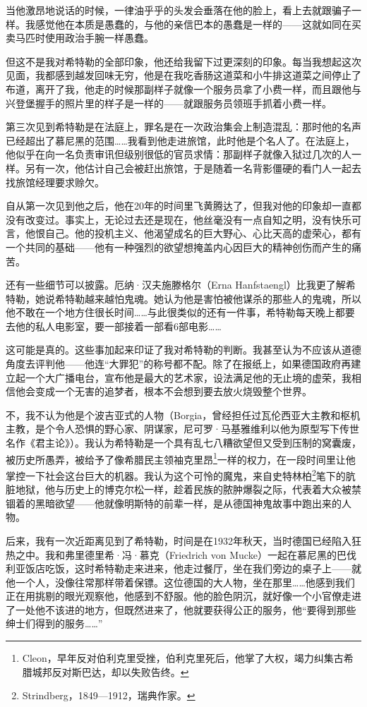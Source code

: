 \documentclass[UTF8]{ctexart}
\begin{document}
当他激昂地说话的时候，一律油乎乎的头发会垂落在他的脸上，看上去就跟骗子一样。我感觉他在本质是愚蠢的，与他的亲信巴本的愚蠢是一样的——这就如同在买卖马匹时使用政治手腕一样愚蠢。

但这不是我对希特勒的全部印象，他还给我留下过更深刻的印象。每当我想起这次见面，我都感到越发回味无穷，他是在我吃香肠这道菜和小牛排这道菜之间停止了布道，离开了我，他走的时候那副样子就像一个服务员拿了小费一样，而且跟他与兴登堡握手的照片里的样子是一样的——就跟服务员领班手抓着小费一样。

第三次见到希特勒是在法庭上，罪名是在一次政治集会上制造混乱：那时他的名声已经超出了慕尼黑的范围……我看到他走进旅馆，此时他是个名人了。在法庭上，他似乎在向一名负责审讯但级别很低的官员求情：那副样子就像入狱过几次的人一样。另有一次，他估计自己会被赶出旅馆，于是随着一名背影僵硬的看门人一起去找旅馆经理要求赊欠。

自从第一次见到他之后，他在20年的时间里飞黄腾达了，但我对他的印象却一直都没有改变过。事实上，无论过去还是现在，他丝毫没有一点自知之明，没有快乐可言，他恨自己。他的投机主义、他渴望成名的巨大野心、心比天高的虚荣心，都有一个共同的基础——他有一种强烈的欲望想掩盖内心因巨大的精神创伤而产生的痛苦。

还有一些细节可以披露。厄纳·汉夫施滕格尔（Erna Hanfstaengl）比我更了解希特勒，她说希特勒越来越怕鬼魂。她认为他是害怕被他谋杀的那些人的鬼魂，所以他不敢在一个地方住很长时间……与此很类似的还有一件事，希特勒每天晚上都要去他的私人电影室，要一部接着一部看6部电影……

这可能是真的。这些事加起来印证了我对希特勒的判断。我甚至认为不应该从道德角度去评判他——他连“大罪犯”的称号都不配。除了在报纸上，如果德国政府再建立起一个大广播电台，宣布他是最大的艺术家，设法满足他的无止境的虚荣，我相信他会变成一个无害的追梦者，根本不会想到要去放火烧毁整个世界。

不，我不认为他是个波吉亚式的人物（Borgia，曾经担任过瓦伦西亚大主教和枢机主教，是个令人恐惧的野心家、阴谋家，尼可罗·马基雅维利以他为原型写下传世名作《君主论》）。我认为希特勒是一个具有乱七八糟欲望但又受到压制的窝囊废，被历史所愚弄，被给予了像希腊民主领袖克里昂\footnote{Cleon，早年反对伯利克里受挫，伯利克里死后，他掌了大权，竭力纠集古希腊城邦反对斯巴达，却以失败告终。}一样的权力，在一段时间里让他掌控一下社会这台巨大的机器。我认为这个可怜的魔鬼，来自史特林柏\footnote{Strindberg，1849—1912，瑞典作家。}笔下的肮脏地狱，他与历史上的博克尔松一样，趁着民族的脓肿爆裂之际，代表着大众被禁锢着的黑暗欲望——他就像明斯特的前辈一样，是从德国神鬼故事中跑出来的人物。

后来，我有一次近距离见到了希特勒，时间是在1932年秋天，当时德国已经陷入狂热之中。我和弗里德里希·冯·慕克（Friedrich von Mucke）一起在慕尼黑的巴伐利亚饭店吃饭，这时希特勒走来进来，他走过餐厅，坐在我们旁边的桌子上——就他一个人，没像往常那样带着保镖。这位德国的大人物，坐在那里……他感到我们正在用挑剔的眼光观察他，他感到不舒服。他的脸色阴沉，就好像一个小官僚走进了一处他不该进的地方，但既然进来了，他就要获得公正的服务，他“要得到那些绅士们得到的服务……”
\end{document}
